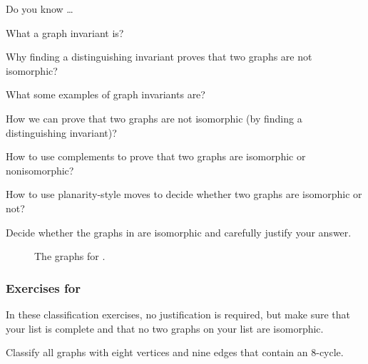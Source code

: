 \begin{exer}[\exerR] %
\label{exer_dyk_nonism}
    Do you know \ldots
        \begin{exerpart}
            \item What a graph invariant is?
            \item Why finding a distinguishing invariant proves that two graphs are not isomorphic?
            \item What some examples of graph invariants are?
            \item How we can prove that two graphs are not isomorphic (by finding a distinguishing invariant)?
            \item How to use complements to prove that two graphs are isomorphic or nonisomorphic?
            \item How to use planarity-style moves to decide whether two graphs are isomorphic or not? 
        \end{exerpart}
\end{exer}

\begin{exer}[\exerE] %
\label{exer_show_nonism_order7}
    Decide whether the graphs in  are isomorphic and carefully justify your answer.
        \begin{figure}[hbtp]
            \centering
            
            \caption{The graphs for .}
            \label{fig_nonism_order7}
        \end{figure}    
\end{exer}


\subsubsection*{Exercises for 
\subgraphclassification}

In these classification exercises, no justification is required, but make sure that your list is complete and that no two graphs on your list are isomorphic.

\begin{exer}[\exerP] %
\label{exer_classify_8cycle_plus_edge}
    Classify all graphs with eight vertices and nine edges that contain an 8-cycle. 
\end{exer}

